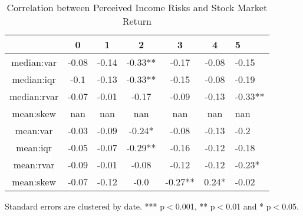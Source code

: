 \documentclass[12pt,notitlepage,onecolumn,aps,pra]{article}
\begin{document}
\begin{table}[ht]
\centering
\begin{threeparttable}
\caption{Correlation between Perceived Income Risks and Stock Market Return}
\label{macro_corr}\begin{tabular}{ccccccl}
\toprule
{} &      0 &      1 &        2 &        3 &      4 &        5 \\
\midrule
median:var  &  -0.08 &  -0.14 &  -0.33** &    -0.17 &  -0.08 &    -0.15 \\
median:iqr  &   -0.1 &  -0.13 &  -0.33** &    -0.15 &  -0.08 &    -0.19 \\
median:rvar &  -0.07 &  -0.01 &    -0.17 &    -0.09 &  -0.13 &  -0.33** \\
mean:skew   &    nan &    nan &      nan &      nan &    nan &      nan \\
mean:var    &  -0.03 &  -0.09 &   -0.24* &    -0.08 &  -0.13 &     -0.2 \\
mean:iqr    &  -0.05 &  -0.07 &  -0.29** &    -0.16 &  -0.12 &    -0.18 \\
mean:rvar   &  -0.09 &  -0.01 &    -0.08 &    -0.12 &  -0.12 &   -0.23* \\
mean:skew   &  -0.07 &  -0.12 &     -0.0 &  -0.27** &  0.24* &    -0.02 \\
\bottomrule
\end{tabular}
\begin{tablenotes}
\item Standard errors are clustered by date. *** p$<$0.001, ** p$<$0.01 and * p$<$0.05. 
\end{tablenotes}
\end{threeparttable}
\end{table}       %
    
    



    
    
\end{document}
